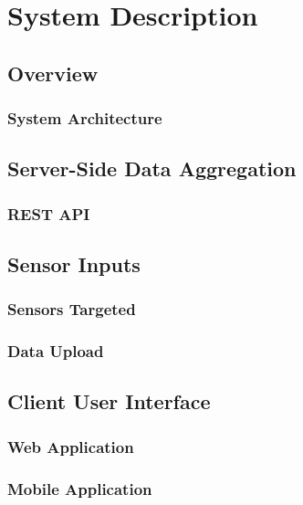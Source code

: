 \chapter{System Description}
\label{cha:system-description}

\section{Overview}

\subsection{System Architecture}


\section{Server-Side Data Aggregation}

\subsection{REST API}


\section{Sensor Inputs}

\subsection{Sensors Targeted}

\subsection{Data Upload}


\section{Client User Interface}

\subsection{Web Application}

\subsection{Mobile Application}
